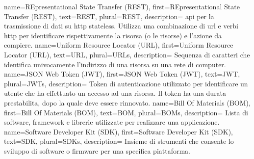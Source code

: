 {
    name={REpresentational State Transfer (REST)},
    first={REpresentational State Transfer (REST)},
    text={REST},
    plural={REST},
    description={
            \gls{api} per la trasmissione di dati su \gls{http} stateless.
            Utilizza una combinazione di \gls{url} e verbi \gls{http} per identificare
            rispettivamente la risorsa (o le risorse) e l'azione da compiere.
        }
}
{
    name={Uniform Resource Locator (URL)},
    first={Uniform Resource Locator (URL)},
    text={URL},
    plural={URLs},
    description={
            Sequenza di caratteri che identifica univocamente l'indirizzo di una risorsa su una rete di computer.
        }
}
{
    name={JSON Web Token (JWT)},
    first={JSON Web Token (JWT)},
    text={JWT},
    plural={JWTs},
    description={
            Token di autenticazione utilizzato per identificare un utente che ha effettuato un accesso ad una risorsa.
            Il token ha una durata prestabilita, dopo la quale deve essere rinnovato.
        }
}
{
    name={Bill Of Materials (BOM)},
    first={Bill Of Materials (BOM)},
    text={BOM},
    plural={BOMs},
    description={
            Lista di software, framework e librerie utilizzate per realizzare una applicazione.
        }
}
{
    name={Software Developer Kit (SDK)},
    first={Software Developer Kit (SDK)},
    text={SDK},
    plural={SDKs},
    description={
            Insieme di strumenti che consente lo sviluppo di software o firmware per una specifica piattaforma.
        }
}
